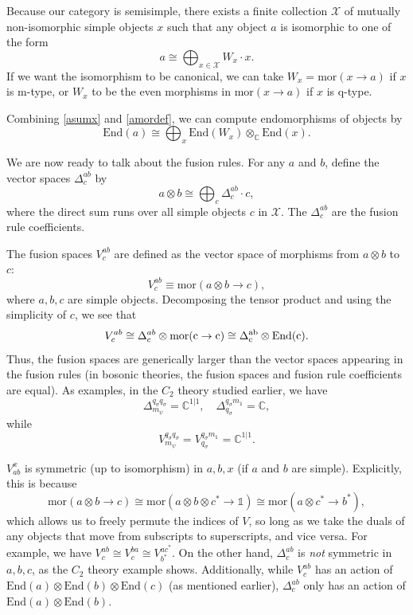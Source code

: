 \documentclass[12pt,a4paper]{article}
\newcounter{arrow}
\newcommand{\tp}{\otimes}
\newcommand{\ra}{\rightarrow}
\newcommand{\unit}{\mathds{1}}
\newcommand{\cc}{\mathbb{C}}
\newcommand{\mcx}{\mathcal{X}}
\newcommand\be            {\begin{equation}}
\newcommand\ee            {\end{equation}}
\newcommand{\mor}{\text{mor}}
\newcommand{\End}{\text{End}}
\begin{document}
Because our category is semisimple, there exists a finite collection $\mcx$ of mutually non-isomorphic simple objects $x$ such
that any object $a$ is isomorphic to one of the form
\be \label{asumx}
	a \cong \bigoplus_{x\in \mcx} W_x\cdot x .
\ee
If we want the isomorphism to be canonical, we can take $W_x = \mor(x\to a)$ if $x$ is m-type, or $W_x$ to be the even morphisms in $\mor(x\to a)$
if $x$ is q-type.

Combining \eqref{asumx} and \eqref{amordef}, we can compute endomorphisms of objects by
\be
	\End(a) \cong \bigoplus_x \End(W_x) \otimes_\cc \End(x).
\ee

We are now ready to talk about the fusion rules. 
For any $a$ and $b$, define the vector spaces $\Delta^{ab}_c$ by
\be
	a \otimes b \cong \bigoplus_c \Delta^{ab}_c \cdot c ,
\ee
where the direct sum runs over all simple objects $c$ in $\mcx$. 
The $\Delta^{ab}_c$ are the fusion rule coefficients. 

The fusion spaces $V^{ab}_c$ are defined as the vector space of morphisms from $a\tp b$ to $c$:
\be \label{defn_of_V_by_Delta}
	V^{ab}_c \equiv \mor(a\tp b \to c),
\ee
where $a,b,c$ are simple objects. 
Decomposing the tensor product and using the simplicity of $c$, we see that 
\be V^{ab}_c \cong \Delta^{ab}_c \tp \rm{mor}(c \ra c) \cong \Delta^{ab}_c \otimes \End(c).\ee
Thus, the fusion spaces are generically larger than the vector spaces appearing in the fusion rules (in bosonic theories, the fusion spaces and fusion rule coefficients are equal).
As examples, in the $C_2$ theory studied earlier, we have 
\be \Delta^{q_\sigma q_\sigma}_{m_\psi} = \cc^{1|1},\quad\Delta^{q_\sigma m_\unit}_{q_\sigma} = \cc,\ee
while 
\be V^{q_\sigma q_\sigma}_{m_\psi} = V^{q_\sigma m_\unit}_{q_\sigma} = \cc^{1|1}.\ee

$V_{ab}^x$ is symmetric (up to isomorphism) in $a,b,x$ (if $a$ and $b$ are simple).
Explicitly, this is because 
\be \mor(a\tp b \ra c) \cong \mor(a\tp b \tp c^* \ra \unit) \cong \mor(a\tp c^* \ra b^*),\ee 
which allows us to freely permute the indices of $V$, so long as we take the duals of any objects that move from subscripts to superscripts, and vice versa. 
For example, we have $V^{ab}_c \cong V^{ba}_c \cong V^{ac^*}_{b^*}$. 
On the other hand, $\Delta^{ab}_c$ is {\it not} symmetric in $a,b,c$, as the $C_2$ theory example shows. 
Additionally, while $V^{ab}_c$ has an action of $\End(a)\otimes\End(b)\otimes\End(c)$ (as mentioned earlier), $\Delta^{ab}_c$
only has an action of $\End(a)\otimes\End(b)$.
\end{document}
